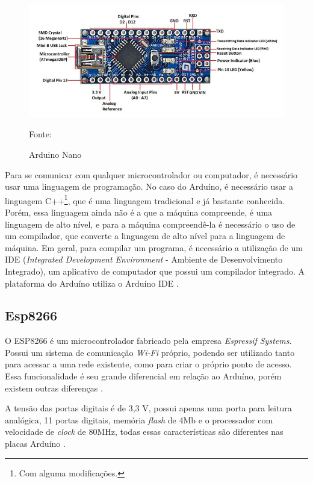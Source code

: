 \begin{figure}[h!]
	\centering
	\includegraphics[keepaspectratio=true,scale=0.77
	]{figuras/arduino_nano.png}
	\caption{ Arduino Nano }
	Fonte: \cite{john2018}
	\label{arduino}	
\end{figure}

Para se comunicar com qualquer microcontrolador ou computador, é necessário usar uma linguagem de programação. No caso do Arduíno, é necessário usar a linguagem C++\footnote{Com alguma modificações.}, que é uma linguagem tradicional e já bastante conhecida. Porém, essa linguagem ainda não é a que a máquina compreende, é uma linguagem de alto nível, e para a máquina compreendê-la é necessário o uso de um compilador, que converte a linguagem de alto nível para a linguagem de máquina. Em geral, para compilar um programa, é necessário a utilização de um IDE (\textit{Integrated Development Environment} - Ambiente de Desenvolvimento Integrado), um aplicativo de computador que possui um compilador integrado. A plataforma do Arduíno utiliza o Arduíno IDE \cite{chavier2016}. 

\subsection{Esp8266}

O ESP8266 é  um microcontrolador  fabricado pela empresa \textit{Espressif Systems}. Possui um sistema de comunicação \textit{Wi-Fi }próprio, podendo ser utilizado tanto para acessar a uma rede existente, como para criar o próprio ponto de acesso.  Essa funcionalidade é seu grande diferencial em relação ao Arduíno, porém existem outras diferenças \cite{oliveira2017}. 

A tensão das portas digitais é de 3,3 V, possui apenas uma porta para leitura analógica, 11 portas digitais, memória \textit{flash} de 4Mb e o processador com velocidade de \textit{clock} de 80MHz, todas essas características são diferentes nas placas Arduíno \cite{wemos2017}.

